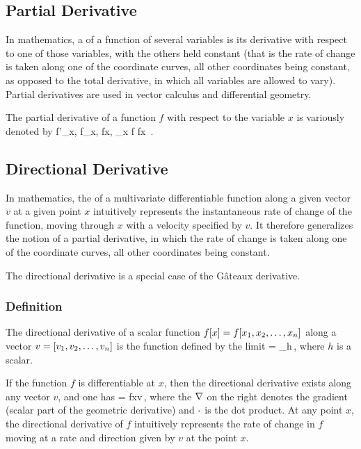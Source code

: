 \subsection{Partial Derivative}
In mathematics, a  of a function of several variables is its derivative with respect to one of those variables, with the others held constant (that is the rate of change is taken along one of the coordinate curves, all other coordinates being constant, as opposed to the total derivative, in which all variables are allowed to vary). Partial derivatives are used in vector calculus and differential geometry.

The partial derivative of a function $f$ with respect to the variable $x$ is variously denoted by
\beq
f'_x, f_x, \cder fx, \partial_x f \xpd fx \,.
\eeq


\subsection{Directional Derivative}
In mathematics, the  of a multivariate differentiable function along a given vector $v$ at a given point $x$ intuitively represents the instantaneous rate of change of the function, moving through $x$ with a velocity specified by $v$. It therefore generalizes the notion of a partial derivative, in which the rate of change is taken along one of the coordinate curves, all other coordinates being constant.

The directional derivative is a special case of the Gâteaux derivative.


\subsubsection{Definition}
The directional derivative of a scalar function $f\!\left[{x}\right] = f\!\left[{x_1,x_2,\dotsc,x_n}\right]$ along a vector $v = \left[{v_1, v_2, \dotsc, v_n}\right]$ is the function defined by the limit
\beq
{} = \lim_{h}\,,
\eeq
where $h$ is a scalar.

If the function $f$ is differentiable at $x$, then the directional derivative exists along any vector $v$, and one has
\beq
{} = \gder f\vat x\iprod v\,,
\eeq
where the $\nabla$ on the right denotes the gradient (scalar part of the geometric derivative) and $\operatorname{\cdot}$ is the dot product. At any point $x$, the directional derivative of $f$ intuitively represents the rate of change in $f$ moving at a rate and direction given by $v$ at the point $x$.

